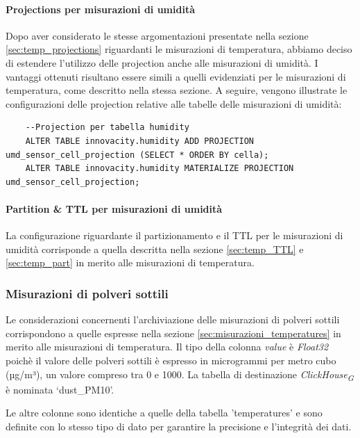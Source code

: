 \paragraph{Projections per misurazioni di umidità} 
Dopo aver considerato le stesse argomentazioni presentate nella sezione \ref{sec:temp_projections} riguardanti le misurazioni di temperatura, abbiamo deciso di estendere l'utilizzo delle projection anche alle misurazioni di umidità. I vantaggi ottenuti risultano essere simili a quelli evidenziati per le misurazioni di temperatura, come descritto nella stessa sezione. A seguire, vengono illustrate le configurazioni delle projection relative alle tabelle delle misurazioni di umidità:

\begin{lstlisting}
    --Projection per tabella humidity
    ALTER TABLE innovacity.humidity ADD PROJECTION umd_sensor_cell_projection (SELECT * ORDER BY cella);
    ALTER TABLE innovacity.humidity MATERIALIZE PROJECTION umd_sensor_cell_projection;
\end{lstlisting}

\paragraph{Partition \& TTL per misurazioni di umidità}
La configurazione riguardante il partizionamento e il TTL per le misurazioni di umidità corrisponde a quella descritta nella sezione \ref{sec:temp_TTL} e \ref{sec:temp_part} in merito alle misurazioni di temperatura.


\subsubsection{Misurazioni di polveri sottili}
Le considerazioni concernenti l'archiviazione delle misurazioni di polveri sottili corrispondono a quelle espresse nella sezione \ref{sec:misurazioni_temperatures} in merito alle misurazioni di temperatura.
Il tipo della colonna \textit{value} è \textit{Float32} poichè il valore delle polveri sottili è espresso in microgrammi per metro cubo (µg/m³), un valore compreso tra 0 e 1000. La tabella di destinazione \textit{ClickHouse}\textsubscript{\textit{G}} è nominata ‘dust\_PM10’.

Le altre colonne sono identiche a quelle della tabella 'temperatures' e sono definite con lo stesso tipo di dato per garantire la precisione e l'integrità dei dati.

